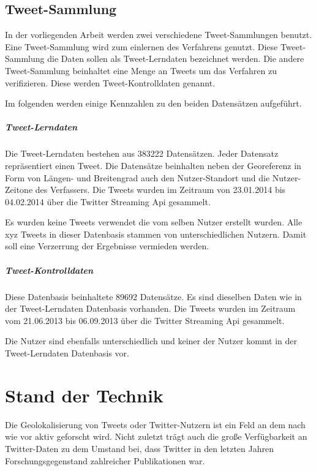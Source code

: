 	\section{Tweet-Sammlung} 
		
		In der vorliegenden Arbeit werden zwei verschiedene Tweet-Sammlungen benutzt.
		Eine Tweet-Sammlung wird zum einlernen des Verfahrens genutzt.
		Diese Tweet-Sammlung die Daten sollen als Tweet-Lerndaten bezeichnet werden.
		Die andere Tweet-Sammlung beinhaltet eine Menge an Tweets um das Verfahren zu verifizieren.
		Diese werden Tweet-Kontrolldaten genannt.

		Im folgenden werden einige Kennzahlen zu den beiden Datensätzen aufgeführt.

		\paragraph{Tweet-Lerndaten} 

			Die Tweet-Lerndaten bestehen aus 383222 Datensätzen.
			Jeder Datensatz repräsentiert einen Tweet. 
			Die Datensätze beinhalten neben der Georeferenz in Form von Längen- und Breitengrad auch den Nutzer-Standort und die Nutzer-Zeitone des Verfassers.
			Die Tweets wurden im Zeitraum von 23.01.2014 bis 04.02.2014 über die Twitter Streaming Api gesammelt.

			Es wurden keine Tweets verwendet die vom selben Nutzer erstellt wurden. 
			Alle xyz Tweets in dieser Datenbasis stammen von unterschiedlichen Nutzern. 
			Damit soll eine Verzerrung der Ergebnisse vermieden werden.

		\paragraph{Tweet-Kontrolldaten}

			Diese Datenbasis beinhaltete 89692 Datensätze.
			Es sind dieselben Daten wie in der Tweet-Lerndaten Datenbasis vorhanden.
			Die Tweets wurden im Zeitraum vom 21.06.2013 bis 06.09.2013 über die Twitter Streaming Api gesammelt.

			Die Nutzer sind ebenfalls unterschiedlich und keiner der Nutzer kommt in der Tweet-Lerndaten Datenbasis vor.

			
\chapter{Stand der Technik} 
	Die Geolokalisierung von Tweets oder Twitter-Nutzern ist ein Feld an dem nach wie vor aktiv geforscht wird.
	Nicht zuletzt trägt auch die große Verfügbarkeit an Twitter-Daten zu dem Umstand bei, dass Twitter in den letzten Jahren Forschungsgegenstand zahlreicher Publikationen war. 
	
